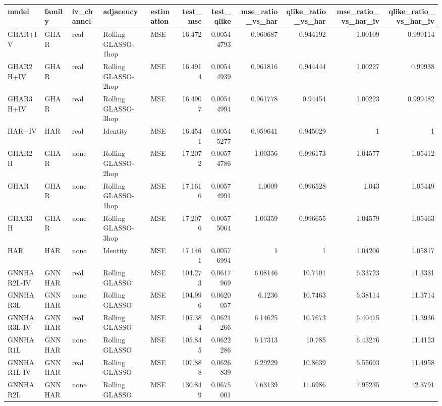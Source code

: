\begin{tabular}{lllllrrrrrr}
\toprule
model & family & iv_channel & adjacency & estimation & test_mse & test_qlike & mse_ratio_vs_har & qlike_ratio_vs_har & mse_ratio_vs_har_iv & qlike_ratio_vs_har_iv \\
\midrule
GHAR+IV & GHAR & real & Rolling GLASSO-1hop & MSE & 16.472 & 0.00544793 & 0.960687 & 0.944192 & 1.00109 & 0.999114 \\
GHAR2H+IV & GHAR & real & Rolling GLASSO-2hop & MSE & 16.4914 & 0.00544939 & 0.961816 & 0.944444 & 1.00227 & 0.99938 \\
GHAR3H+IV & GHAR & real & Rolling GLASSO-3hop & MSE & 16.4907 & 0.00544994 & 0.961778 & 0.94454 & 1.00223 & 0.999482 \\
HAR+IV & HAR & real & Identity & MSE & 16.4541 & 0.00545277 & 0.959641 & 0.945029 & 1 & 1 \\
GHAR2H & GHAR & none & Rolling GLASSO-2hop & MSE & 17.2072 & 0.00574786 & 1.00356 & 0.996173 & 1.04577 & 1.05412 \\
GHAR & GHAR & none & Rolling GLASSO-1hop & MSE & 17.1616 & 0.00574991 & 1.0009 & 0.996528 & 1.043 & 1.05449 \\
GHAR3H & GHAR & none & Rolling GLASSO-3hop & MSE & 17.2076 & 0.00575064 & 1.00359 & 0.996655 & 1.04579 & 1.05463 \\
HAR & HAR & none & Identity & MSE & 17.1461 & 0.00576994 & 1 & 1 & 1.04206 & 1.05817 \\
GNNHAR2L-IV & GNNHAR & real & Rolling GLASSO & MSE & 104.273 & 0.0617969 & 6.08146 & 10.7101 & 6.33723 & 11.3331 \\
GNNHAR3L & GNNHAR & none & Rolling GLASSO & MSE & 104.996 & 0.0620057 & 6.1236 & 10.7463 & 6.38114 & 11.3714 \\
GNNHAR3L-IV & GNNHAR & real & Rolling GLASSO & MSE & 105.384 & 0.0621266 & 6.14625 & 10.7673 & 6.40475 & 11.3936 \\
GNNHAR1L & GNNHAR & none & Rolling GLASSO & MSE & 105.845 & 0.0622286 & 6.17313 & 10.785 & 6.43276 & 11.4123 \\
GNNHAR1L-IV & GNNHAR & real & Rolling GLASSO & MSE & 107.888 & 0.0626839 & 6.29229 & 10.8639 & 6.55693 & 11.4958 \\
GNNHAR2L & GNNHAR & none & Rolling GLASSO & MSE & 130.849 & 0.0675001 & 7.63139 & 11.6986 & 7.95235 & 12.3791 \\
\bottomrule
\end{tabular}
